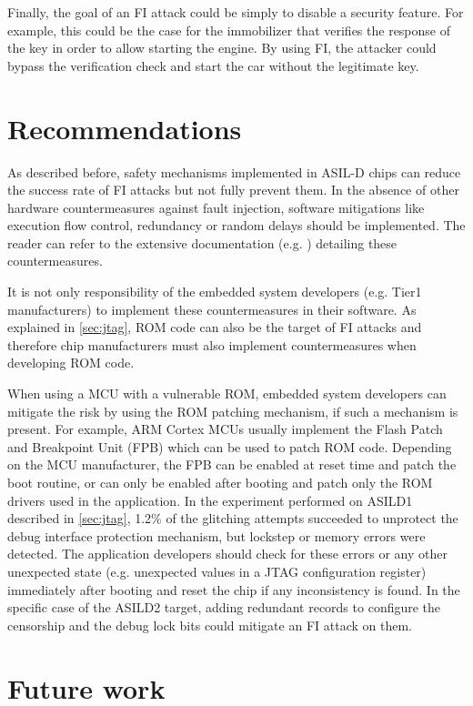 \documentclass[a4paper, 10pt]{IEEEtran}
\newcommand{\TI}{ASILD1\xspace}
\newcommand{\ST}{ASILD2\xspace}
\begin{document}
Finally, the goal of an FI attack could be simply to disable a security feature. For example, this could be the case for the immobilizer that verifies the response of the key in order to allow starting the engine. By using FI, the attacker could bypass the verification check and start the car without the legitimate key.


\section{Recommendations}

As described before, safety mechanisms implemented in ASIL-D chips can reduce the success rate of FI attacks but not fully prevent them. In the absence of other hardware countermeasures against fault injection, software mitigations like execution flow control, redundancy or random delays should be implemented. The reader can refer to the extensive documentation (e.g. \cite{witteman_secure_coding,verbauwhede_fault_2011}) detailing these countermeasures.

It is not only responsibility of the embedded system developers (e.g. Tier1 manufacturers) to implement these countermeasures in their software. As explained in \autoref{sec:jtag}, ROM code can also be the target of FI attacks and therefore chip manufacturers must also implement countermeasures when developing ROM code. 

When using a MCU with a vulnerable ROM, embedded system developers can mitigate the risk by using the ROM patching mechanism, if such a mechanism is present. For example, ARM Cortex MCUs usually implement the Flash Patch and Breakpoint Unit (FPB) which can be used to patch ROM code. Depending on the MCU manufacturer, the FPB can be enabled at reset time and patch the boot routine, or can only be enabled after booting and patch only the ROM drivers used in the application. In the experiment performed on \TI described in \autoref{sec:jtag}, 1.2\% of the glitching attempts succeeded to unprotect the debug interface protection mechanism, but lockstep or memory errors were detected. The application developers should check for these errors or any other unexpected state (e.g. unexpected values in a JTAG configuration register) immediately after booting and reset the chip if any inconsistency is found. 
In the specific case of the \ST target, adding redundant records to configure the censorship and the debug lock bits could mitigate an FI attack on them.

\section{Future work}
\end{document}

